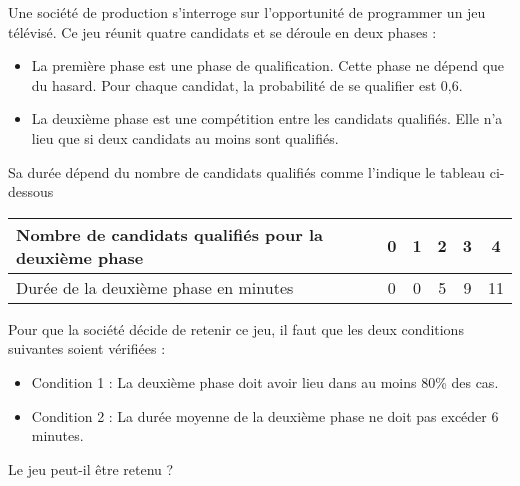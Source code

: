 \documentclass[11pt,fleqn, openany]{book} %
\begin{document}
\begin{exercise}[topic=prob13, subtitle={(Centres étrangers 2023)}] Une société de production s'interroge sur l'opportunité de programmer un jeu télévisé.
Ce jeu réunit quatre candidats et se déroule en deux phases :
\begin{itemize}
\item  La première phase est une phase de qualification.
Cette phase ne dépend que du hasard. Pour chaque candidat, la probabilité de se qualifier est 0,6.
\item La deuxième phase est une compétition entre les candidats qualifiés.
Elle n'a lieu que si deux candidats au moins sont qualifiés.\end{itemize}
Sa durée dépend du nombre de candidats qualifiés comme l'indique le tableau ci-dessous
\vspace{-0.3cm}
\begin{center}
\begin{tabular}{|l|c|c|c|c|c|}
\hline
Nombre de candidats qualifiés
pour la deuxième phase & 0 &1& 2& 3&4 \\
\hline
Durée de la deuxième phase en
minutes &0& 0& 5& 9& 11\\
\hline \end{tabular}
\end{center}
\vspace{-0.3cm}
Pour que la société décide de retenir ce jeu, il faut que les deux conditions suivantes soient vérifiées :
\begin{itemize}
\item Condition 1 : La deuxième phase doit avoir lieu dans au moins 80\% des cas.
\item Condition 2 : La durée moyenne de la deuxième phase ne doit pas excéder 6 minutes.\end{itemize}
Le jeu peut-il être retenu ? \end{exercise}
\end{document}
